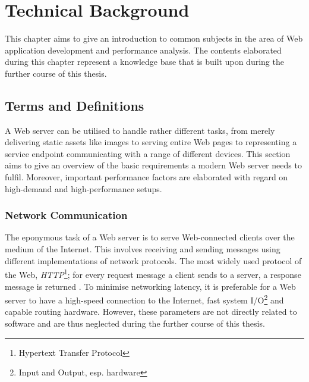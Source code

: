 \chapter{Technical Background}
\label{lab:technical}

This chapter aims to give an introduction to common subjects in the area of Web application development and performance analysis. The contents elaborated during this chapter represent a knowledge base that is built upon during the further course of this thesis.

\section{Terms and Definitions}
\label{sec:terms}

A Web server can be utilised to handle rather different tasks, from merely delivering static assets like images to serving entire Web pages to representing a service endpoint communicating with a range of different devices. This section aims to give an overview of the basic requirements a modern Web server needs to fulfil. Moreover, important performance factors are elaborated with regard on high-demand and high-performance setups.

\subsection{Network Communication}
The eponymous task of a Web server is to serve Web-connected clients over the medium of the Internet. This involves receiving and sending messages using different implementations of network protocols. The most widely used protocol of the Web, \textit{HTTP}\footnote{Hypertext Transfer Protocol}; for every request message a client sends to a server, a response message is returned \cite{http}. To minimise networking latency, it is preferable for a Web server to have a high-speed connection to the Internet, fast system I/O\footnote{\label{lab:io}Input and Output, esp. hardware} and capable routing hardware. However, these parameters are not directly related to software and are thus neglected during the further course of this thesis.


